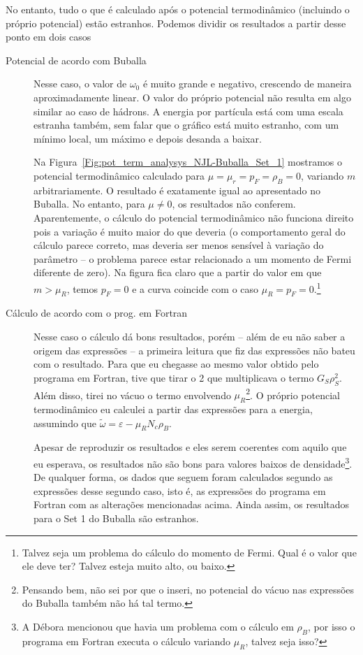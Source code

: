 \begin{enumerate}
No entanto, tudo o que é calculado após o potencial termodinâmico (incluindo o próprio potencial) estão estranhos. Podemos dividir os resultados a partir desse ponto em dois casos
\begin{description}
	\item[Potencial de acordo com Buballa] Nesse caso, o valor de $\omega_0$ é muito grande e negativo, crescendo de maneira aproximadamente linear. O valor do próprio potencial não resulta em algo similar ao caso de hádrons. A energia por partícula está com uma escala estranha também, sem falar que o gráfico está muito estranho, com um mínimo local, um máximo e depois desanda a baixar.

Na Figura~\ref{Fig:pot_term_analysys_NJL-Buballa_Set_1} mostramos o potencial termodinâmico calculado para $\mu = \mu_r = p_F = \rho_B = 0$, variando $m$ arbitrariamente. O resultado é exatamente igual ao apresentado no Buballa. No entanto, para $\mu \neq 0$, os resultados não conferem. Aparentemente, o cálculo do potencial termodinâmico não funciona direito pois a variação é muito maior do que deveria (o comportamento geral do cálculo parece correto, mas deveria ser menos sensível à variação do parâmetro -- o problema parece estar relacionado a um momento de Fermi diferente de zero). Na figura fica claro que a partir do valor em que $m > \mu_R$, temos $p_F = 0$ e a curva coincide com o caso $\mu_R = p_F = 0$.\footnote{Talvez seja um problema do cálculo do momento de Fermi. Qual é o valor que ele deve ter? Talvez esteja muito alto, ou baixo.}

	\item[Cálculo de acordo com o prog. em Fortran] Nesse caso o cálculo dá bons resultados, porém -- além de eu não saber a origem das expressões -- a primeira leitura que fiz das expressões não bateu com o resultado. Para que eu chegasse ao mesmo valor obtido pelo programa em Fortran, tive que tirar o 2 que multiplicava o termo $G_S \rho_S^2$. Além disso, tirei no vácuo o termo envolvendo $\mu_R$\footnote{Pensando bem, não sei por que o inseri, no potencial do vácuo nas expressões do Buballa também não há tal termo.}. O próprio potencial termodinâmico eu calculei a partir das expressões para a energia, assumindo que $\tilde{\omega} = \varepsilon - \mu_R N_c \rho_B$.
	
	Apesar de reproduzir os resultados e eles serem coerentes com aquilo que eu esperava, os resultados não são bons para valores baixos de densidade\footnote{A Débora mencionou que havia um problema com o cálculo em $\rho_B$, por isso o programa em Fortran executa o cálculo variando $\mu_R$, talvez seja isso?}. De qualquer forma, os dados que seguem foram calculados segundo as expressões desse segundo caso, isto é, as expressões do programa em Fortran com as alterações mencionadas acima. Ainda assim, os resultados para o Set 1 do Buballa são estranhos.
	

\end{description}
\end{enumerate}
